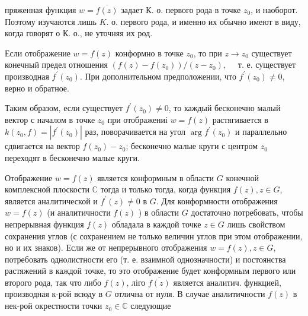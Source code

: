 \documentclass[10pt]{article}
\begin{document}
пряженная функция $w=\overline{f(z)}$ задает К. о. первого рода в точке $z_{0}$, и наоборот. Поэтому изучаются лишь $K$. $о$. первого рода, и именно их обычно имеют в виду, когда говорят о К. о., не уточняя их род.



Если отображение $w=f(z)$ конформно в точке $z_{0}$, то при $z \rightarrow z_{0}$ существует конечный предел отношения $\left(f(z)-f\left(z_{0}\right)\right) /\left(z-z_{0}\right), \quad$ т. е. существует производная $f^{\prime}\left(z_{0}\right)$. При дополнительном предположении, что $f^{\prime}\left(z_{0}\right) \neq 0$, верно и обратное.



Таким образом, если существует $f^{\prime}\left(z_{0}\right) \neq 0$, то каждый бесконечно малый вектор с началом в точке $z_{0}$ при отображениі $w=f(z)$ растягивается в $k\left(z_{0}, f\right)=\left|f^{\prime}\left(z_{0}\right)\right|$ раз, поворачивается на угол $\arg f^{\prime}\left(z_{0}\right)$ и параллельно сдвигается на вектор $f\left(z_{0}\right)-z_{0}$; бесконечно малые круги с центром $z_{0}$ переходят в бесконечно малые круги.



Отображение $w=f(z)$ является конформным в области $G$ конечной комплексной плоскости $\mathbb{C}$ тогда и только тогда, когда функция $f(z), z \in G$, является аналитической и $f^{\prime}(z) \neq 0$ в $G$. Для конформности отображения $w=f(z)$ (и аналитичности $f(z)$ ) в области $G$ достаточно потребовать, чтобы непрерывная функция $f(z)$ обладала в каждой точке $z \in G$ лишь свойством сохранения углов (с сохранением не только величин углов при этом отображении, но и их знаков). Если же от непрерывного отображения $w=f(z), z \in G$, потребовать однолистности его (т. е. взаимной однозначности) и постоянства растяжений в каждой точке, то это отображение будет конформным первого или второго рода, так что либо $f(z)$, ліго $\overline{f(z)}$ является аналитич. функцией, производная к-рой всюду в $G$ отлична от нуля. В случае аналитичности $f(z)$ в нек-рой окрестности точки $z_{0} \in \mathbb{C}$ следующие
\end{document}
